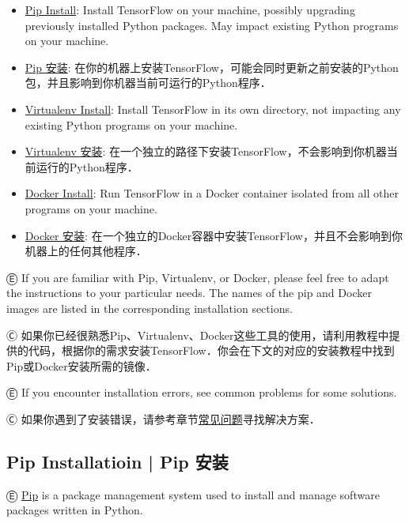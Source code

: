 \begin{itemize}
\item \hyperref[pip_install]{Pip Install}: \textcolor{etc}{Install TensorFlow on your machine, possibly upgrading previously installed Python packages. May impact existing Python programs on your machine.}\\
\item \hyperref[pip_install]{Pip 安装}: 在你的机器上安装TensorFlow，可能会同时更新之前安装的Python包，并且影响到你机器当前可运行的Python程序．\\
\item \hyperref[virtualenv_install]{Virtualenv Install}: \textcolor{etc}{Install TensorFlow in its own directory, not impacting any existing Python programs on your machine.}\\
\item \hyperref[virtualenv_install]{Virtualenv 安装}: 在一个独立的路径下安装TensorFlow，不会影响到你机器当前运行的Python程序．\\
\item \hyperref[docker_install]{Docker Install}: \textcolor{etc}{Run TensorFlow in a Docker container isolated from all other programs on your machine.}\\
\item \hyperref[docker_install]{Docker 安装}: 在一个独立的Docker容器中安装TensorFlow，并且不会影响到你机器上的任何其他程序．
\end{itemize}

Ⓔ \textcolor{etc}{If you are familiar with Pip, Virtualenv, or Docker, please feel free to adapt the instructions to your particular needs. The names of the pip and Docker images are listed in the corresponding installation sections.}

Ⓒ 如果你已经很熟悉Pip、Virtualenv、Docker这些工具的使用，请利用教程中提供的代码，根据你的需求安装TensorFlow．你会在下文的对应的安装教程中找到Pip或Docker安装所需的镜像．

Ⓔ \textcolor{etc}{If you encounter installation errors, see common problems for some solutions.}

Ⓒ 如果你遇到了安装错误，请参考章节\hyperref[comm_prob]{常见问题}寻找解决方案．

%
\subsection {Pip Installatioin  |  Pip 安装} \label{pip_install}

Ⓔ \textcolor{etc}{\href{https://en.wikipedia.org/wiki/Pip_(package_manager)}{Pip} is a package management system used to install and manage software packages written in Python.}

